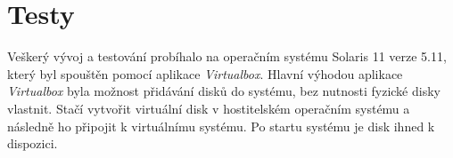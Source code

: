 \section{Testy}
Veškerý vývoj a testování probíhalo na operačním systému Solaris 11 verze 5.11, který byl spouštěn pomocí aplikace \emph{Virtualbox}. Hlavní výhodou aplikace \emph{Virtualbox} byla možnost přidávání disků do systému, bez nutnosti fyzické disky vlastnit. Stačí vytvořit virtuální disk v hostitelském operačním systému a následně ho připojit k virtuálnímu systému. Po startu systému je disk ihned k dispozici.


